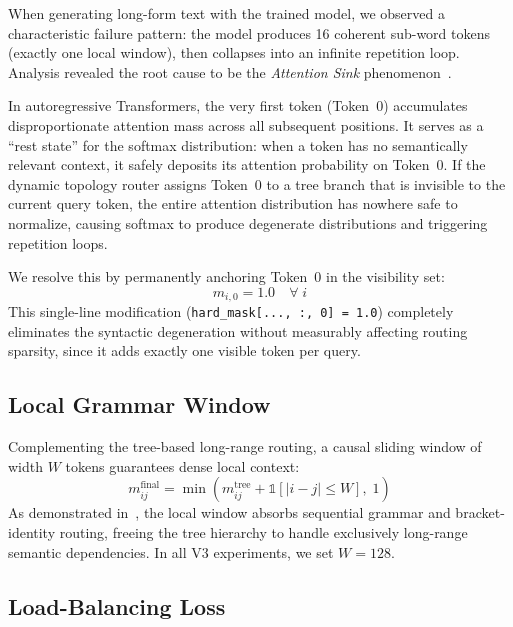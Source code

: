 \documentclass[11pt,a4paper]{article}
\begin{document}
When generating long-form text with the trained model, we observed a characteristic failure pattern: the model produces 16 coherent sub-word tokens (exactly one local window), then collapses into an infinite repetition loop. Analysis revealed the root cause to be the \emph{Attention Sink} phenomenon~\citep{xiao2023efficient}.

In autoregressive Transformers, the very first token (Token~0) accumulates disproportionate attention mass across all subsequent positions. It serves as a ``rest state'' for the softmax distribution: when a token has no semantically relevant context, it safely deposits its attention probability on Token~0. If the dynamic topology router assigns Token~0 to a tree branch that is invisible to the current query token, the entire attention distribution has nowhere safe to normalize, causing softmax to produce degenerate distributions and triggering repetition loops.

We resolve this by permanently anchoring Token~0 in the visibility set:
\begin{equation}
    m_{i,0} = 1.0 \quad \forall\; i
\end{equation}
This single-line modification (\texttt{hard\_mask[..., :, 0] = 1.0}) completely eliminates the syntactic degeneration without measurably affecting routing sparsity, since it adds exactly one visible token per query.

\subsection{Local Grammar Window}

Complementing the tree-based long-range routing, a causal sliding window of width $W$ tokens guarantees dense local context:
\begin{equation}
    m_{ij}^{\text{final}} = \min\!\left(m_{ij}^{\text{tree}} + \mathbb{1}\!\left[|i - j| \leq W\right],\; 1\right)
\end{equation}
As demonstrated in~\citet{learningtoskip2026}, the local window absorbs sequential grammar and bracket-identity routing, freeing the tree hierarchy to handle exclusively long-range semantic dependencies. In all V3 experiments, we set $W = 128$.

\subsection{Load-Balancing Loss}
\end{document}
